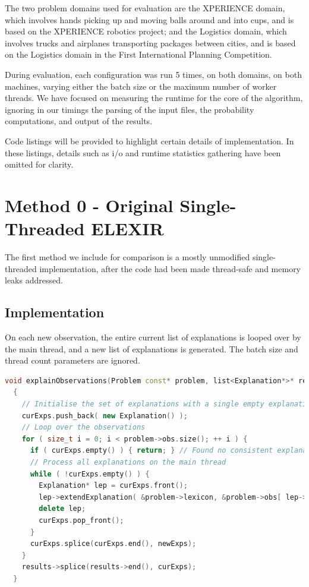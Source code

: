 \documentclass[12pt,twoside,abbrevs,msc,ai,notimes,logo,sansheadings]{infthesis}
\begin{document}
  The two problem domains used for evaluation are the XPERIENCE domain, which involves hands picking up and moving balls around and into cups, and is based on the XPERIENCE robotics project\cite{bib:xper}; and the Logistics domain, which involves trucks and airplanes transporting packages between cities, and is based on the Logistics domain in the First International Planning Competition\cite{bib:ipc}.
  
  During evaluation, each configuration was run 5 times, on both domains, on both machines, varying either the batch size or the maximum number of worker threads. We have focused on measuring the runtime for the core of the algorithm, ignoring in our timings the parsing of the input files, the probability computations, and output of the results.
  
  
  Code listings will be provided to highlight certain details of implementation. In these listings, details such as i/o and runtime statistics gathering have been omitted for clarity.
  
  \chapter {Method 0 - Original Single-Threaded ELEXIR}
  
  The first method we include for comparison is a mostly unmodified single-threaded implementation, after the code had been made thread-safe and memory leaks addressed.
  
  \section {Implementation}
  
  On each new observation, the entire current list of explanations is looped over by the main thread, and a new list of explanations is generated. The batch size and thread count parameters are ignored.
  
  \begin{lstlisting}[language=C++]
  void explainObservations(Problem const* problem, list<Explanation*>* results)
  {
    // Initialise the set of explanations with a single empty explanation
    curExps.push_back( new Explanation() );
    // Loop over the observations
    for ( size_t i = 0; i < problem->obs.size(); ++ i ) {
      if ( curExps.empty() ) { return; } // Found no consistent explanations
      // Process all explanations on the main thread
      while ( !curExps.empty() ) {
        Explanation* lep = curExps.front();
        lep->extendExplanation( &problem->lexicon, &problem->obs[ lep->obsIndex ], &newExps );
        delete lep;
        curExps.pop_front();
      }
      curExps.splice(curExps.end(), newExps);
    }
    results->splice(results->end(), curExps);
  }
  \end{lstlisting}
  
\end{document}
